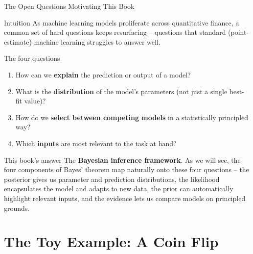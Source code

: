 \documentclass[aspectratio=169,10pt]{beamer}
\begin{document}
\begin{frame}[allowframebreaks]{The Open Questions Motivating This Book}
  \begin{block}{Intuition}
    As machine learning models proliferate across quantitative finance, a
    common set of hard questions keeps resurfacing -- questions that
    standard (point-estimate) machine learning struggles to answer well.
  \end{block}
  \begin{block}{The four questions}
    \begin{enumerate}
      \item How can we \textbf{explain} the prediction or output of a model?
      \item What is the \textbf{distribution} of the model's parameters
      (not just a single best-fit value)?
      \item How do we \textbf{select between competing models} in a
      statistically principled way?
      \item Which \textbf{inputs} are most relevant to the task at hand?
    \end{enumerate}
  \end{block}
  \begin{block}{This book's answer}
    The \textbf{Bayesian inference framework}. As we will see, the four
    components of Bayes' theorem map naturally onto these four questions --
    the posterior gives us parameter and prediction distributions, the
    likelihood encapsulates the model and adapts to new data, the prior can
    automatically highlight relevant inputs, and the evidence lets us
    compare models on principled grounds.
  \end{block}
\end{frame}

\section{The Toy Example: A Coin Flip}
\end{document}
